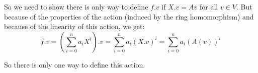 
So we need to show there is only way to define $f.v$ if $X.v=Av$ for all $v \in V$. But because of the properties of the action (induced by the ring homomorphism) and because of the linearity of this action, we get:
\[f.v=(\sum_{i=0}^n a_i X^i).v = \sum_{i=0}^n a_i (X.v)^i = \sum_{i=0}^n a_i (A(v))^i \]

So there is only one way to define this action.
